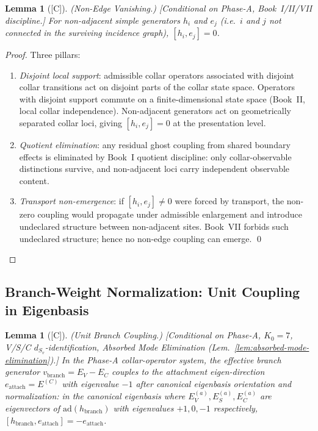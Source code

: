 \documentclass[12pt,oneside]{amsbook}
\theoremstyle{plain}
\newtheorem{lemma}[theorem]{Lemma}
\theoremstyle{definition}
\theoremstyle{remark}
\newcommand{\status}[1]{\textup{[#1]}}
\begin{document}
\begin{lemma}[\status{C}]\label{lem:E8-non-edge-vanishing}
\textup{(Non-Edge Vanishing.)}
\textup{[Conditional on Phase-A, Book~I/II/VII discipline.]}
For non-adjacent simple generators $h_i$ and $e_j$ (i.e.\ $i$ and $j$
not connected in the surviving incidence graph), $[h_i, e_j] = 0$.
\end{lemma}

\begin{proof}
Three pillars:
\begin{enumerate}[label=\textup{(\arabic*)}]
 \item \emph{Disjoint local support}: admissible collar operators
 associated with disjoint collar transitions act on disjoint parts
 of the collar state space. Operators with disjoint support commute
 on a finite-dimensional state space (Book~II, local collar
 independence). Non-adjacent generators act on geometrically
 separated collar loci, giving $[h_i, e_j] = 0$ at the
 presentation level.
 \item \emph{Quotient elimination}: any residual ghost coupling from
 shared boundary effects is eliminated by Book~I quotient
 discipline: only collar-observable distinctions survive, and
 non-adjacent loci carry independent observable content.
 \item \emph{Transport non-emergence}: if $[h_i, e_j] \neq 0$ were
 forced by transport, the non-zero coupling would propagate under
 admissible enlargement and introduce undeclared structure between
 non-adjacent sites. Book~VII forbids such undeclared structure;
 hence no non-edge coupling can emerge. \qed
\end{enumerate}
\end{proof}

\subsection{Branch-Weight Normalization: Unit Coupling in Eigenbasis}

\begin{lemma}[\status{C}]\label{lem:E8-unit-coupling}
\textup{(Unit Branch Coupling.)}
\textup{[Conditional on Phase-A, $K_0=7$, V/S/C $d_{S_v}$-identification,
Absorbed Mode Elimination (Lem.~\ref{lem:absorbed-mode-elimination}).]}
In the Phase-A collar-operator system, the effective branch generator
$v_{\mathrm{branch}} = E_V - E_C$ couples to the attachment
eigen-direction $e_{\mathrm{attach}} = E^{(C)}$ with eigenvalue $-1$
after canonical eigenbasis orientation and normalization: in the
canonical eigenbasis where $E_V^{(a)}, E_S^{(a)}, E_C^{(a)}$ are
eigenvectors of $\mathrm{ad}(h_{\mathrm{branch}})$ with eigenvalues
$+1, 0, -1$ respectively,
$[h_{\mathrm{branch}}, e_{\mathrm{attach}}] = -e_{\mathrm{attach}}$.
\end{lemma}
\end{document}
